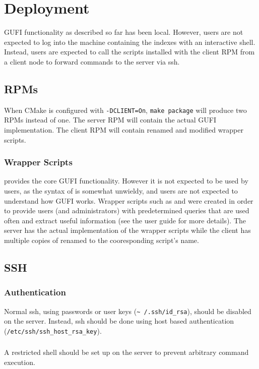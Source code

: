\section{Deployment}
\label{sec:deploy}
GUFI functionality as described so far has been local. However, users
are not expected to log into the machine containing the indexes with
an interactive shell. Instead, users are expected to call the
scripts installed with the client RPM from a client node to forward
commands to the server via ssh.

\subsection{RPMs}
When CMake is configured with \texttt{-DCLIENT=On}, \texttt{make
package} will produce two RPMs instead of one. The server RPM will
contain the actual GUFI implementation. The client RPM will contain
renamed and modified \guficlient wrapper scripts.

\subsubsection{Wrapper Scripts}
\gufiquery provides the core GUFI functionality. However it is not
expected to be used by users, as the syntax of \gufiquery is somewhat
unwieldy, and users are not expected to understand how GUFI
works. Wrapper scripts such as \gufifind and \gufils were created in
order to provide users (and administrators) with predetermined queries
that are used often and extract useful information (see the user guide
for more details). The server has the actual implementation of the
wrapper scripts while the client has multiple copies of \guficlient
renamed to the cooresponding script's name.

\subsection{SSH}
\subsubsection{Authentication}
Normal ssh, using passwords or user keys (\texttt{\textasciitilde
  /.ssh/id\_rsa}), should be disabled on the server. Instead, ssh
should be done using host based authentication
(\texttt{/etc/ssh/ssh\_host\_rsa\_key}).

\subsubsection{\gufijail}
\label{sec:gufi_jail}
A restricted shell should be set up on the server to prevent arbitrary
command execution.

